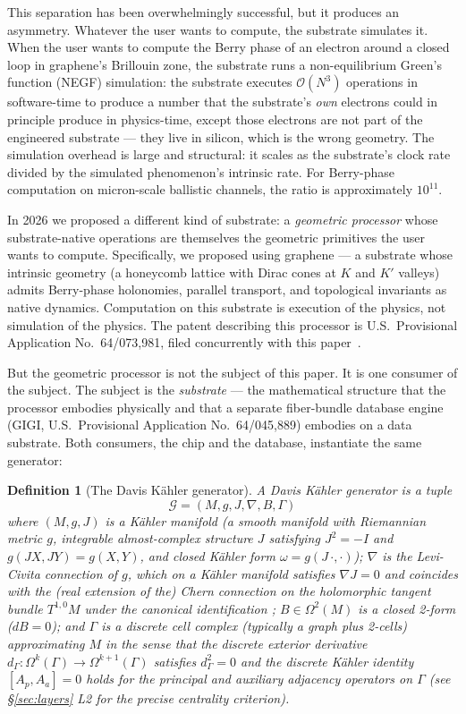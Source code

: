 \documentclass[11pt,letterpaper]{article}
\newtheorem{definition}[theorem]{Definition}
\begin{document}
This separation has been overwhelmingly successful, but it produces an
asymmetry. Whatever the user wants to compute, the substrate
simulates it. When the user wants to compute the Berry phase of an
electron around a closed loop in graphene's Brillouin zone, the
substrate runs a non-equilibrium Green's function (NEGF) simulation:
the substrate executes $\mathcal{O}(N^3)$ operations in
software-time to produce a number that the substrate's \emph{own}
electrons could in principle produce in physics-time, except those
electrons are not part of the engineered substrate --- they live in
silicon, which is the wrong geometry. The simulation overhead is
large and structural: it scales as the substrate's clock rate divided
by the simulated phenomenon's intrinsic rate. For Berry-phase
computation on micron-scale ballistic channels, the ratio is
approximately $10^{11}$.

In 2026 we proposed a different kind of substrate: a \emph{geometric
processor} whose substrate-native operations are themselves the
geometric primitives the user wants to compute. Specifically, we
proposed using graphene --- a substrate whose intrinsic geometry (a
honeycomb lattice with Dirac cones at $K$ and $K'$ valleys) admits
Berry-phase holonomies, parallel transport, and topological
invariants as native dynamics. Computation on this substrate is
execution of the physics, not simulation of the physics. The patent
describing this processor is U.S.\ Provisional Application
No.\ 64/073,981, filed concurrently with this paper~\cite{davis2026dpu}.

But the geometric processor is not the subject of this paper. It is
one consumer of the subject. The subject is the \emph{substrate} ---
the mathematical structure that the processor embodies physically and
that a separate fiber-bundle database engine (GIGI, U.S.\ Provisional
Application No.\ 64/045,889) embodies on a data substrate. Both
consumers, the chip and the database, instantiate the same generator:

\begin{definition}[The Davis K\"ahler generator]
\label{def:generator}
A \emph{Davis K\"ahler generator} is a tuple
\[
\mathcal{G} = (M, g, J, \nabla, B, \Gamma)
\]
where $(M, g, J)$ is a K\"ahler manifold (a smooth manifold with
Riemannian metric $g$, integrable almost-complex structure $J$
satisfying $J^2 = -I$ and $g(J X, J Y) = g(X, Y)$, and closed
K\"ahler form $\omega = g(J\,\cdot, \cdot)$); $\nabla$ is the
Levi-Civita connection of $g$, which on a K\"ahler manifold satisfies
$\nabla J = 0$ and coincides with the (real extension of the) Chern
connection on the holomorphic tangent bundle $T^{1,0} M$ under the
canonical identification \cite[Vol.~II, Ch.~IX, Thm.~4.6]{kobayashi1969foundations};
$B \in \Omega^2(M)$ is a closed 2-form ($dB = 0$); and $\Gamma$ is a
discrete cell complex (typically a graph plus 2-cells) approximating
$M$ in the sense that the discrete exterior derivative
$d_\Gamma: \Omega^k(\Gamma) \to \Omega^{k+1}(\Gamma)$ satisfies
$d_\Gamma^2 = 0$ and the discrete K\"ahler identity
$[A_p, A_a] = 0$ holds for the principal and auxiliary adjacency
operators on $\Gamma$ (see \S\ref{sec:layers} L2 for the precise
centrality criterion).
\end{definition}
\end{document}
